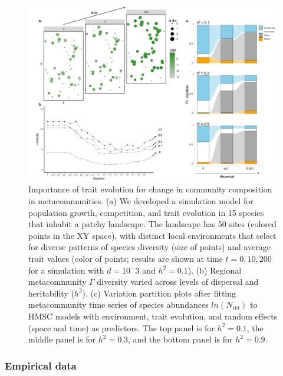 \documentclass[
]{article}
\begin{document}
\begin{figure}

{\centering \includegraphics[width=1.1\linewidth]{../output/fig2_mod} 

}

\caption{Importance of trait evolution for change in community composition in metacommunities. (a) We developed a simulation model for population growth, competition, and trait evolution in 15 species that inhabit a patchy landscape. The landscape has 50 sites (colored points in the XY space), with distinct local environments that select for diverse patterns of species diversity (size of points) and average trait values (color of points; results are shown at time $t=0, 10, 200$ for a simulation with $d=10^-3$ and $h^2 = 0.1$). (b) Regional metacommunity $\Gamma$ diversity varied across levels of dispersal and heritability ($h^2$). (c) Variation partition plots after fitting metacommunity time series of species abundances $ln(N_{ikt})$ to HMSC models with environment, trait evolution, and random effects (space and time) as predictors. The top panel is for $h^2 = 0.1$, the middle panel is for $h^2 = 0.3$, and the bottom panel is for $h^2 = 0.9$.}\label{fig:fig2}
\end{figure}

\hypertarget{empirical-data}{%
\subsubsection{Empirical data}\label{empirical-data}}
\end{document}
